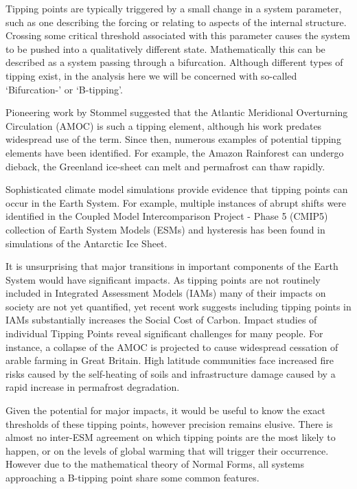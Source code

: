Tipping points are typically triggered by a small change in a system parameter, such as one describing the forcing or relating to aspects of the internal structure. Crossing some critical threshold associated with this parameter causes the system to be pushed into a qualitatively 
different state. Mathematically this can be described as a system passing through a bifurcation. 
Although different types of tipping exist\cite{Ashwin2012}, in the analysis here 
we will be concerned with so-called `Bifurcation-' or `B-tipping'.


Pioneering work by Stommel suggested that the Atlantic Meridional Overturning 
Circulation (AMOC)\cite{STOMMEL1961} is such a tipping element, although
his work predates widespread use of the term. Since then,
numerous examples of potential tipping elements have been identified.
For example, the Amazon Rainforest can undergo dieback\cite{Cox2000}, the 
Greenland ice-sheet can melt\cite{Feldmann2015} and
permafrost can thaw rapidly\cite{Steffen2018}.

Sophisticated climate model simulations\cite{Rahmstorf1995} provide evidence that tipping points can occur in the Earth System.
For example, multiple
instances of abrupt shifts were identified in the Coupled Model Intercomparison Project - Phase 5 (CMIP5)\cite{Taylor2012}
collection of Earth System Models (ESMs)\cite{Drijfhout2015} and hysteresis has been found in 
simulations of the Antarctic Ice Sheet\cite{Garbe2020}. 

It is unsurprising that major transitions in important components
of the Earth System would have significant impacts. As tipping points
are not routinely included in Integrated Assessment Models (IAMs) many of 
their impacts on society are not yet quantified, yet recent 
work\cite{Dietz2021}
suggests including tipping points in IAMs
substantially increases the Social Cost 
of Carbon. Impact studies of individual 
Tipping Points reveal significant challenges for many people. For instance, a 
collapse of the AMOC is projected to cause
widespread cessation of arable farming in Great Britain\cite{Ritchie2020a}.
High latitude communities face increased fire risks caused 
by the self-heating of soils\cite{Clarke2021} and infrastructure damage 
caused by a rapid increase in permafrost degradation\cite{Teufel2019}. 


Given the potential for major impacts, it would be useful to know the exact thresholds of
these tipping points, however precision remains elusive\cite{Steffen2018}.
There is almost no inter-ESM
agreement on which tipping points are the most likely to happen, or on the
levels of global warming that will trigger their
occurrence\cite{Drijfhout2015}.
However due to the mathematical theory of Normal 
Forms\cite{Strogatz2015,guckenheimer2013}, all systems approaching a
B-tipping point share some common features.


